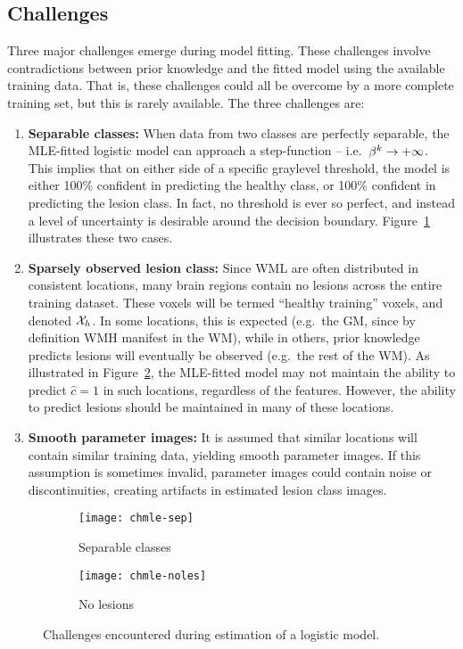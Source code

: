 \subsection{Challenges}\label{ss:vlr-chmle}
Three major challenges emerge during model fitting.
These challenges involve contradictions between prior knowledge
and the fitted model using the available training data.
That is, these challenges could all be overcome by a more complete training set,
but this is rarely available.
The three challenges are:
\begin{enumerate}
  \item\label{chmle:separable} \textbf{Separable classes:}
  When data from two classes are perfectly separable,
  the MLE-fitted logistic model can approach a step-function -- i.e.\ $\beta^k\rightarrow+\infty$.
  This implies that on either side of a specific graylevel threshold,
  the model is either 100\% confident in predicting the healthy class,
  or 100\% confident in predicting the lesion class.
  In fact, no threshold is ever so perfect,
  and instead a level of uncertainty is desirable around the decision boundary.
  Figure~\ref{fig:chmle-sep} illustrates these two cases.
  \item\label{chmle:sparse} \textbf{Sparsely observed lesion class:}
  Since WML are often distributed in consistent locations,
  many brain regions contain no lesions across the entire training dataset.
  These voxels will be termed ``healthy training'' voxels, and denoted $\mathcal{X}_{h}$.
  In some locations, this is expected
  (e.g.\ the GM, since by definition WMH manifest in the WM),
  while in others, prior knowledge predicts lesions will eventually be observed
  (e.g.\ the rest of the WM).
  As illustrated in Figure~\ref{fig:chmle-noles},
  the MLE-fitted model may not maintain the ability to predict $\hat{c} = 1$ in such locations,
  regardless of the features.
  However, the ability to predict lesions should be maintained in many of these locations.
  \item\label{chmle:noisy} \textbf{Smooth parameter images:}
  It is assumed that similar locations will contain similar training data,
  yielding smooth parameter images.
  If this assumption is sometimes invalid,
  parameter images could contain noise or discontinuities,
  creating artifacts in estimated lesion class images.
\end{enumerate}
\begin{figure}
  \centering
  \begin{subfigure}{\plotwidth}
    \texttt{[image: chmle-sep]}
    \caption{Separable classes}%
    \label{fig:chmle-sep}
  \end{subfigure}
  \begin{subfigure}{\plotwidth}
    \texttt{[image: chmle-noles]}
    \caption{No lesions}%
    \label{fig:chmle-noles}
  \end{subfigure}
  \caption{Challenges encountered during estimation of a logistic model.}%
  \label{fig:chmle}
\end{figure}
